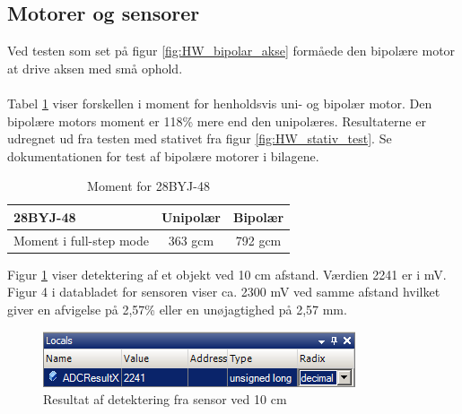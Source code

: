 \subsection{Motorer og sensorer}
Ved testen som set på figur \ref{fig:HW_bipolar_akse} formåede den bipolære motor at drive aksen med små ophold.
\\
\\
Tabel \ref{tab:motor_moment} viser forskellen i moment for henholdsvis uni- og bipolær motor. Den bipolære motors moment er 118\% mere end den unipolæres. Resultaterne er udregnet ud fra testen med stativet fra figur \ref{fig:HW_stativ_test}. Se dokumentationen for test af bipolære motorer i bilagene.

\begin{table}[H]
  	\centering
	\begin{tabular}{ |l|c|c| }
  		\hline
  		\textbf{28BYJ-48} & Unipolær & Bipolær\\
  		\hline
  		Moment i full-step mode & 363 gcm & 792 gcm \\
  		\hline
	\end{tabular}
	\caption[]{Moment for 28BYJ-48\footnotemark}
	\label{tab:motor_moment}
\end{table}

\noindent
Figur \ref{Sensor_10cm} viser detektering af et objekt ved 10 cm afstand. Værdien 2241 er i mV. Figur 4 i databladet for sensoren viser ca. 2300 mV ved samme afstand hvilket giver en afvigelse på 2,57\% eller en unøjagtighed på 2,57 mm.

\begin{figure}[H]
	\includegraphics[scale=1]{tex/Test/Motor-sensor/Sensor_10cm.png}
	\caption{Resultat af detektering fra sensor ved 10 cm}
	\label{Sensor_10cm}
\end{figure}